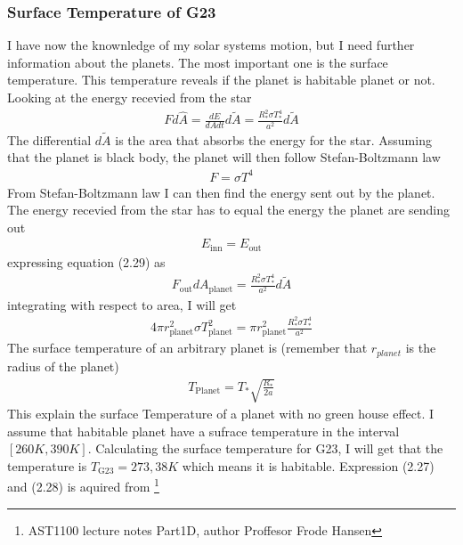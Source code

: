 \documentclass[a4paper,11pt,english]{report}
\begin{document}
\subsubsection{Surface Temperature of G23}
I have now the knownledge of my solar systems
motion, but I need further information about the planets. The most important
one is the surface temperature. This temperature reveals if the planet is
habitable planet or not. Looking at the energy recevied from the star
\begin{align}
  Fd\hat{A}= \frac{dE}{dAdt}d\tilde{A} = \frac{R_{*}^{2}\sigma T_{*}^{4}}{a^{2}}d\tilde{A}
\end{align}
 The differential
\(d\tilde{A}\) is the area that absorbs the energy for the star. Assuming that
the planet is black body, the planet will then follow Stefan-Boltzmann law
\begin{align}
  F = \sigma T^{4}
\end{align}
From Stefan-Boltzmann law I can then find the energy sent out by the planet.
The energy recevied from the star has to equal the energy the planet are
sending out
\begin{align}
  E_{\mathrm{inn}} = E_{\mathrm{out}} 
\end{align}
expressing equation (2.29) as
\begin{align}
  F_{\mathrm{out}}dA_{\mathrm{planet}} = \frac{R^{2}_{*}\sigma T^{4}_{*}}{a^{2}}d\tilde{A}
\end{align}
integrating with respect to area, I will get
\begin{align}
  4\pi r^{2}_{\mathrm{planet}}\sigma T_{\mathrm{planet}}^{2} = \pi
  r_{\mathrm{planet}}^{2}  \frac{R^{2}_{*}\sigma T^{4}_{*}}{a^{2}}
\end{align}
The surface temperature of an arbitrary planet is (remember that \(r_{planet}\)
is the radius of the planet)
\begin{align}
  T_{\mathrm{Planet}} = T_{*}\sqrt{\frac{R_{*}}{2a}}
\end{align}
This explain the surface Temperature of a planet with no green house effect.
I assume that habitable planet have a sufrace temperature in the interval
\([260K, 390K]\). Calculating the surface temperature for G23, I will get that
the temperature is \(T_{\mathrm{G23}} = 273,38K\) which means it is habitable.
Expression (2.27) and (2.28) is aquired from
\footnote{AST1100 lecture notes Part1D, author Proffesor Frode Hansen}
\end{document}
